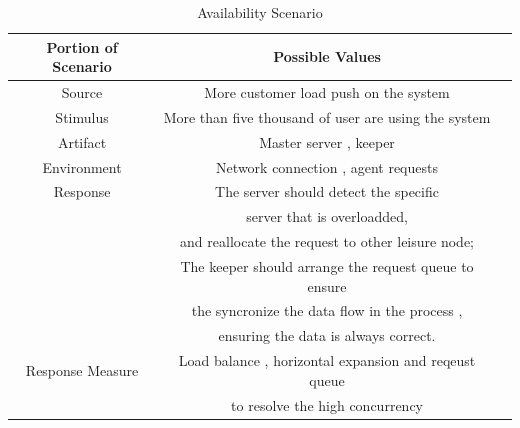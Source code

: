 \documentclass{article}
\begin{document}
	\begin{center}
		\begin{table}[!htb]
		\begin{tabular}{ccc}
		\toprule  
		Portion of Scenario & Possible Values\\
		\midrule 
		Source 				& More customer load push on the system\\
		Stimulus 			& More than five thousand of user are using the system\\
		Artifact 			& Master server , keeper\\
		Environment 		& Network connection , agent requests \\
		Response 			& The server should detect the specific \\
							& server that is overloadded, \\
							& and reallocate the request to other leisure node;\\
							& The keeper should arrange the request queue to ensure \\
							& the syncronize the data flow in the process ,\\
							& ensuring the data is always correct.\\
		Response Measure 	& Load balance , horizontal expansion and reqeust queue \\
							& to resolve the high concurrency\\


		\bottomrule
		\end{tabular}
		\caption{Availability Scenario}
		\end{table}
	\end{center}
\end{document}
